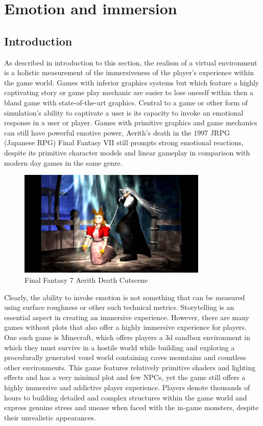 \section{Emotion and immersion}
\subsection{Introduction}
As described in introduction to this section, the realism of a virtual environment is a holistic measurement of the immersiveness of the player's experience within the game world. Games with inferior graphics systems but which feature a highly captivating story or game play mechanic are easier to lose oneself within then a bland game with state-of-the-art graphics. Central to a game or other form of simulation's ability to captivate a user is its capacity to invoke an emotional response in a user or player. Games with primitive graphics and game mechanics can still have powerful emotive power, Aerith's death in the 1997 JRPG (Japanese RPG) Final Fantasy VII still prompts strong emotional reactions, despite its primitive character models and linear gameplay in comparison with modern day games in the same genre. \cite{fig:FF7} 
\begin{figure}[ht!]
\centering
\includegraphics[width=90mm]{maxresdefault.jpg}
\caption{Final Fantasy 7 Aerith Death Cutscene \label{overflow}}
\label{fig:FF7}
\end{figure}
Clearly, the ability to invoke emotion is not something that can be measured using surface roughness or other such technical metrics. Storytelling is an essential aspect in creating an immersive experience. However, there are many games without plots that also offer a highly immersive experience for players. One such game is Minecraft, which offers players a 3d sandbox environment in which they must survive in a hostile world while building and exploring a procedurally generated voxel world containing caves mountains and countless other environments. This game features relatively primitive shaders and lighting effects and has a very minimal plot and few NPCs, yet the game still offers a highly immersive and addictive player experience. Players denote thousands of hours to building detailed and complex structures within the game world and express genuine stress and unease when faced with the in-game monsters, despite their unrealistic appearances. \cite{fig:MCmonster} 
